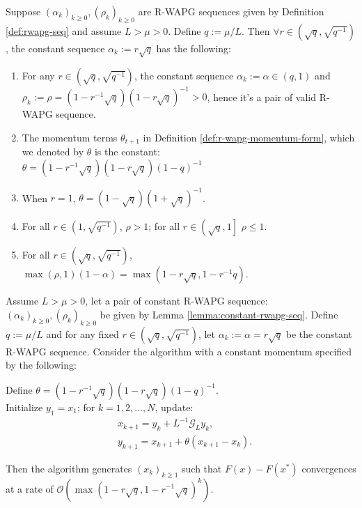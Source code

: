 \documentclass[12pt]{article}
\begin{document}
        \begin{lemma}\label{lemma:constant-rwapg-seq}
            Suppose $(\alpha_k)_{k \ge 0}, (\rho_k)_{k \ge 0}$ are R-WAPG sequences given by Definition \ref{def:rwapg-seq} and assume $L > \mu > 0$.
            Define $q := \mu/L$. 
            Then $\forall r \in \left(\sqrt{q},\sqrt{q^{-1}}\right)$, the constant sequence $\alpha_k := r \sqrt{q}$ has the following: 
            \begin{enumerate}
                \item For any $r \in \left(\sqrt{q}, \sqrt{q^{-1}}\right)$, the constant sequence $\alpha_k := \alpha \in (q, 1)$ and\\
                $\rho_k := \rho=\left(1-r^{-1}\sqrt{q}\right)\left(1 - r \sqrt{q}\right)^{-1} > 0$, hence it's a pair of valid R-WAPG sequence. 
                \item The momentum terms $\theta_{t + 1}$ in Definition \ref{def:r-wapg-momentum-form}, which we denoted by $\theta$ is the constant:\\ $\theta = (1 - r^{-1}\sqrt{q})(1 - r\sqrt{q})(1- q)^{-1}$
                \item When $r = 1$, $\theta = (1- \sqrt{q})(1 + \sqrt{q})^{-1}$. 
                \item For all $r \in \left(1, \sqrt{q^{-1}}\right)$, $\rho > 1$; for all $r \in \left(\sqrt{q}, 1\right]$ $\rho \le 1$. 
                \item For all $r \in \left(\sqrt{q}, \sqrt{q^{-1}}\right)$, $\max(\rho, 1)(1 - \alpha) = \max\left(1 - r\sqrt{q}, 1 - r^{-1}q\right)$. 
            \end{enumerate}
        \end{lemma}
        \begin{theorem}\label{thm:fixed-momentum-fista}
            Assume $L > \mu > 0$, let a pair of constant R-WAPG sequence: $(\alpha_k)_{k \ge0}, (\rho_k)_{k \ge 0}$ be given by Lemma \ref{lemma:constant-rwapg-seq}.
            Define $q := \mu/L$ and for any fixed $r \in \left(\sqrt{q}, \sqrt{q^{-1}}\right)$, let $\alpha_k := \alpha = r \sqrt{q}$ be the constant R-WAPG sequence. 
            Consider the algorithm with a constant momentum specified by the following: 
            \begin{tcolorbox}
                Define $\theta = \left(1 - r^{-1}\sqrt{q}\right)(1 - r\sqrt{q})(1 - q)^{-1}$. 
                \\
                Initialize $y_1 = x_1$; for $k = 1, 2, \ldots, N$, update: 
                \begin{align*}
                    &x_{k + 1} = y_k + L^{-1}\mathcal G_L y_k, 
                    \\
                    & y_{k + 1} = x_{k + 1} + \theta(x_{k + 1} - x_k). 
                \end{align*}
            \end{tcolorbox}
            Then the algorithm generates $(x_k)_{k \ge 1}$ such that $F(x) - F(x^*)$ convergences at a rate of $\mathcal O\left(\max(1 - r\sqrt{q}, 1 - r^{-1}\sqrt{q})^k\right)$. 
        \end{theorem}
\end{document}
